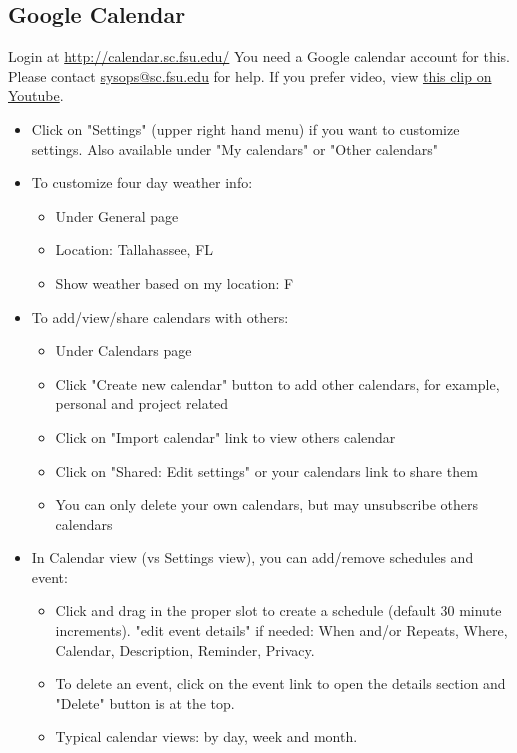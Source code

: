 \documentclass[12pt,a4paper]{article}
\begin{document}
\subsection*{Google Calendar}
Login at \url{http://calendar.sc.fsu.edu/}
You need a Google calendar account for this. Please contact \href{mailto:sysops@sc.fsu.edu}{sysops@sc.fsu.edu} for help.
If you prefer video, view \href{https://www.youtube.com/watch?v=E-k-3G0sZ14}{this clip on Youtube}.
\begin{itemize}
    \item Click on "Settings" (upper right hand menu) if you want to customize settings. Also available under "My calendars" or "Other calendars"
    \item To customize four day weather info:
        \begin{itemize}
            \item Under General page
            \item Location: Tallahassee, FL
            \item Show weather based on my location: F
        \end{itemize}
    \item To add/view/share calendars with others:
        \begin{itemize}
            \item Under Calendars page
            \item Click "Create new calendar" button to add other calendars, for example, personal and project related
            \item Click on "Import calendar" link to view others calendar
            \item Click on "Shared: Edit settings" or your calendars link to share them
            \item You can only delete your own calendars, but may unsubscribe others calendars
        \end{itemize}
    \item In Calendar view (vs Settings view), you can add/remove schedules and event:
        \begin{itemize}
            \item Click and drag in the proper slot to create a schedule (default 30 minute increments). "edit event details" if needed: When and/or Repeats, Where, Calendar, Description, Reminder, Privacy.
            \item To delete an event, click on the event link to open the details section and "Delete" button is at the top.
            \item Typical calendar views: by day, week and month.

\end{itemize}
\end{itemize}
\end{document}
